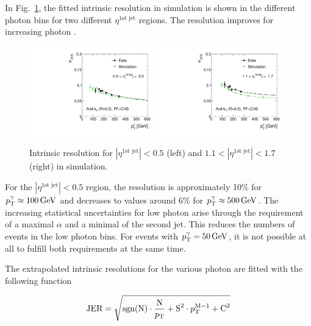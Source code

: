 In \mbox{Fig. \ref{fig:ResolutionOfPtgamma}}, the fitted intrinsic resolution in simulation is shown in the different photon \pt bins for two different $\eta^{\text{1st jet}}$ regions.
The resolution improves for increasing photon \pt. 
\begin{figure}[tbp]
  \centering
    \includegraphics[width=0.49\textwidth]{figures/resolution/methodology/Resolution_for_1_eta_bin_PFCHS_mc_RMS99.pdf}
    \includegraphics[width=0.49\textwidth]{figures/resolution/methodology/Resolution_for_3_eta_bin_PFCHS_mc_RMS99.pdf}
  \caption{Intrinsic resolution for $|\eta^{\text{1st jet}}| < 0.5$ (left) and $1.1<|\eta^{\text{1st jet}}| < 1.7$ (right) in simulation.}  
  \label{fig:ResolutionOfPtgamma}
\end{figure}
For the $|\eta^{\text{1st jet}}|<0.5$ region, the resolution is approximately 10\% for $p_{\text{T}}^{\gamma} \approx 100\,\text{Ge}\kern-0.06667em\text{V}$ and decreases to values around 6\% for  
$p_{\text{T}}^{\gamma} \approx 500\,\text{Ge}\kern-0.06667em\text{V}$.
The increasing statistical uncertainties for low photon \pt arise through the requirement of a maximal $\alpha$ and a minimal \pt of the second jet. 
This reduces the numbers of events in the low photon \pt bins. For events with $p_{\text{T}}^{\gamma}=50\,\text{Ge}\kern-0.06667em\text{V}$, it is not possible at all to fulfill both requirements at the same time.

The extrapolated intrinsic resolutions for the various photon \pt are fitted with the following function

\begin{equation}
\label{eq:PFresolution}
\text{JER} = \sqrt{\text{sgn(N)} \cdot \frac{\text{N}}{p_{\text{T}}}  + \text{S}^2 \cdot p_{\text{T}}^{\text{M}-1} +  \text{C}^2 }
\end{equation}

